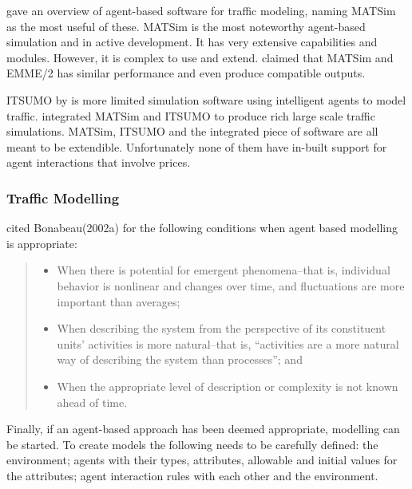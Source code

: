 \textcite{Bernhardt2007taxi+agent} gave an overview of agent-based software for
traffic modeling, naming MATSim as the most useful of these. MATSim is the most
noteworthy agent-based simulation and in active development. It has very
extensive capabilities and modules. However, it is complex to use and extend.
\textcite{Gao2010taxi+comparison} claimed that MATSim and EMME/2 has similar
performance and even produce compatible outputs.

ITSUMO by \textcite{Silva2006itsumo} is more limited simulation software using
intelligent agents to model traffic. \textcite{Bazzan2009integrating}
integrated  MATSim and ITSUMO to produce rich large scale traffic simulations.
MATSim, ITSUMO and the integrated piece of software are all meant to be
extendible. Unfortunately none of them have in-built support for agent
interactions that involve prices.


\subsubsection{Traffic Modelling}

\textcite[78]{Bernhardt2007taxi+agent} cited Bonabeau(2002a) for the following
conditions when agent based modelling is appropriate:

\begin{quote}
\begin{itemize}
  \item When there is potential for emergent phenomena--that is, individual 
  behavior is nonlinear and changes over time, and fluctuations are more 
  important than averages;
  \item When describing the system from the perspective of its constituent 
  units’ activities is more natural--that is, “activities are a more natural way
  of describing the system than processes”; and
  \item When the appropriate level of description or complexity is not known 
  ahead of time.
\end{itemize}
\end{quote}

Finally, if an agent-based approach has been deemed appropriate, modelling can
be started. To create models the following needs to be carefully defined: the
environment; agents with their types, attributes, allowable and initial values
for the attributes; agent interaction rules with each other and the
environment. \parencite{Bernhardt2007taxi+agent}
